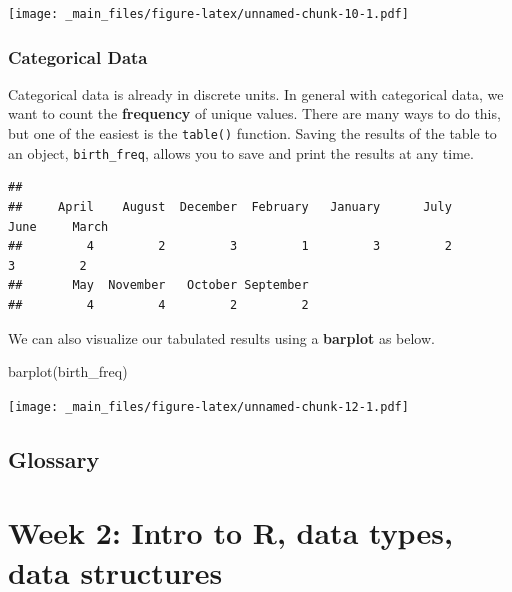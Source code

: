 \documentclass[
]{book}
\newenvironment{Shaded}{\begin{snugshade}}{\end{snugshade}}
\newcommand{\FunctionTok}[1]{\textcolor[rgb]{0.00,0.00,0.00}{#1}}
\newcommand{\NormalTok}[1]{#1}
\newcommand{\OtherTok}[1]{\textcolor[rgb]{0.56,0.35,0.01}{#1}}
\newcommand{\SpecialCharTok}[1]{\textcolor[rgb]{0.00,0.00,0.00}{#1}}
\begin{document}
\texttt{[image: \_main\_files/figure-latex/unnamed-chunk-10-1.pdf]}

\hypertarget{categorical-data}{%
\subsection{Categorical Data}\label{categorical-data}}

Categorical data is already in discrete units. In general with categorical data, we want to count the \textbf{frequency} of unique values. There are many ways to do this, but one of the easiest is the \texttt{table()} function. Saving the results of the table to an object, \texttt{birth\_freq}, allows you to save and print the results at any time.

\begin{Shaded}
\end{Shaded}

\begin{verbatim}
## 
##     April    August  December  February   January      July      June     March 
##         4         2         3         1         3         2         3         2 
##       May  November   October September 
##         4         4         2         2
\end{verbatim}

We can also visualize our tabulated results using a \textbf{barplot} as below.

\begin{Shaded}
\begin{Highlighting}[]
\FunctionTok{barplot}\NormalTok{(birth\_freq)}
\end{Highlighting}
\end{Shaded}

\texttt{[image: \_main\_files/figure-latex/unnamed-chunk-12-1.pdf]}

\hypertarget{glossary}{%
\section{Glossary}\label{glossary}}

\hypertarget{week-2-intro-to-r-data-types-data-structures}{%
\chapter{Week 2: Intro to R, data types, data structures}\label{week-2-intro-to-r-data-types-data-structures}}
\end{document}
